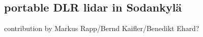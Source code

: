 \subsection{portable DLR lidar in Sodankyl\"a}
contribution by Markus Rapp/Bernd Kaifler/Benedikt Ehard?